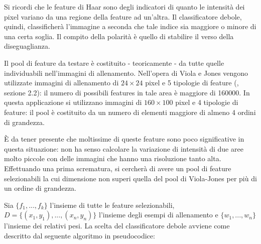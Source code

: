 Si ricordi che le feature di Haar sono degli indicatori di quanto le intensità dei pixel variano da una regione della feature ad un'altra. Il classificatore debole, quindi, classificherà l'immagine a seconda che tale indice sia maggiore o minore di una certa soglia. Il compito della polarità è quello di stabilire il verso della diseguaglianza.

Il pool di feature da testare è costituito - teoricamente - da tutte quelle individuabili nell'immagini di allenamento. Nell'opera di Viola e Jones vengono utilizzate immagini di allenamento di $24 \times 24$ pixel e 5 tipologie di feature (\cite{Viola04}, sezione 2.2): il numero di possibili features in tale area è maggiore di 160000. In questa applicazione si utilizzano immagini di $160 \times 100$ pixel e 4 tipologie di feature: il pool è costituito da un numero di elementi maggiore di almeno 4 ordini di grandezza.

È da tener presente che moltissime di queste feature sono poco significative in questa situazione: non ha senso calcolare la variazione di intensità di due aree molto piccole con delle immagini che hanno una risoluzione tanto alta. Effettuando una prima scrematura, si cercherà di avere un pool di feature selezionabili la cui dimensione non superi quella del pool di Viola-Jones per più di un ordine di grandezza.

Sia $\{ f_1,...,f_k\}$ l'insieme di tutte le feature selezionabili, $D = \{(x_1,y_1), ..., (x_n, y_n) \}$ l'insieme degli esempi di allenamento e $\{w_1, ..., w_n\}$ l'insieme dei relativi pesi. La scelta del classificatore debole avviene come descritto dal seguente algoritmo in pseudocodice:

